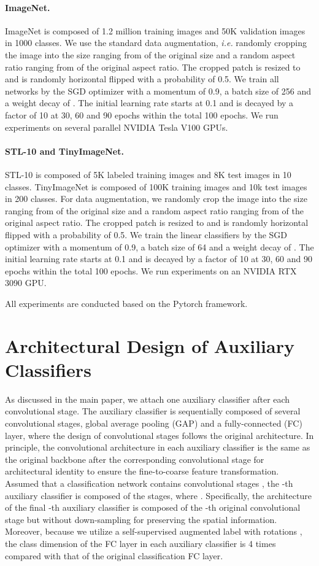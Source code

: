 \documentclass{article}
\begin{document}
\paragraph{ImageNet.} ImageNet is composed of 1.2 million training images and 50K validation images in 1000 classes. We use the standard data augmentation, \emph{i.e.} randomly cropping the image into the size ranging from  of the original size and a random aspect ratio ranging from   of the original aspect ratio. The cropped patch is resized to  and is randomly horizontal flipped with a probability of 0.5. We train all networks by the SGD optimizer with a momentum of 0.9, a batch size of 256 and a weight decay of . The initial learning rate starts at 0.1 and is decayed by a factor of 10 at 30, 60 and 90 epochs within the total 100 epochs. We run experiments on several parallel NVIDIA Tesla V100 GPUs.
\paragraph{STL-10 and TinyImageNet.} STL-10 is composed of 5K labeled training images and 8K test images in 10 classes. TinyImageNet is composed of 100K training images and 10k test images in 200 classes. For data augmentation, we randomly crop the image into the size ranging from  of the original size and a random aspect ratio ranging from   of the original aspect ratio. The cropped patch is resized to  and is randomly horizontal flipped with a probability of 0.5. We train the linear classifiers by the SGD optimizer with a momentum of 0.9, a batch size of 64 and a weight decay of . The initial learning rate starts at 0.1 and is decayed by a factor of 10 at 30, 60 and 90 epochs within the total 100 epochs. We run experiments on an NVIDIA RTX 3090 GPU.


All experiments are conducted based on the Pytorch framework.

\section{Architectural Design of Auxiliary Classifiers}

As discussed in the main paper, we attach one auxiliary classifier after each convolutional stage. The auxiliary classifier is sequentially composed of several convolutional stages, global average pooling (GAP) and a fully-connected (FC) layer, where the design of convolutional stages follows the original architecture. In principle, the convolutional architecture in each auxiliary classifier is the same as the original backbone after the corresponding convolutional stage for architectural identity to ensure the fine-to-coarse feature transformation. Assumed that a classification network  contains  convolutional stages , the -th auxiliary classifier is composed of the  stages, where . Specifically, the architecture of the final -th auxiliary classifier is composed of the -th original convolutional stage but without down-sampling for preserving the spatial information. Moreover, because we utilize a self-supervised augmented label with rotations , the class dimension of the FC layer in each auxiliary classifier is 4 times compared with that of the original classification FC layer.
\end{document}
